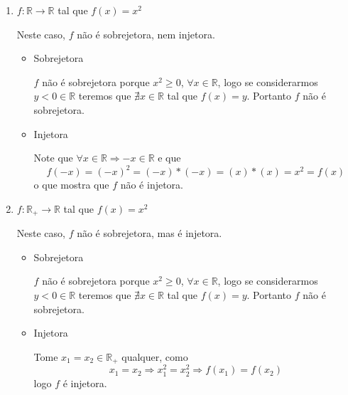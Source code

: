 \begin{exem}

 \begin{enumerate}
  \item $f: \mathbb{R} \rightarrow \mathbb{R}$ tal que $f(x) = x^2$

  Neste caso, $f$ não é sobrejetora, nem injetora.

  \begin{dem}

   \begin{itemize}
    \item Sobrejetora

    $f$ não é sobrejetora porque $x^2 \geq 0$, $\forall x \in \mathbb{R}$, logo se considerarmos $y < 0 \in \mathbb{R}$ teremos que $\nexists x \in \mathbb{R}$ tal que $f(x)= y$. Portanto $f$ não é sobrejetora.
    \fim
    \item Injetora

     Note que $ \forall x \in \mathbb{R} \Rightarrow -x \in \mathbb{R}$ e que
\begin{equation}
f(-x)= (-x)^2 = (-x)*(-x) = (x)*(x) = x^2 = f(x)
\end{equation}
    o que mostra que $f$ não é injetora.

   \end{itemize}
  \end{dem}

  \item $f: \mathbb{R_{+}} \rightarrow \mathbb{R}$ tal que $f(x) = x^2$

  Neste caso, $f$ não é sobrejetora, mas é injetora.

  \begin{dem}
   \begin{itemize}
    \item Sobrejetora

    $f$ não é sobrejetora porque $x^2 \geq 0$, $\forall x \in \mathbb{R}$, logo se considerarmos $y < 0 \in \mathbb{R}$ teremos que $\nexists x \in \mathbb{R}$ tal que $f(x)= y$. Portanto $f$ não é sobrejetora.
    \fim
    \item Injetora

    Tome $x_1=x_2 \in \mathbb{R_{+}}$ qualquer, como
\begin{equation}
x_1=x_2 \Rightarrow x_1^2=x_2^2 \Rightarrow f(x_1)=f(x_2)
\end{equation}
    logo $f$ é injetora.

   \end{itemize}
  \end{dem}


\end{enumerate}
\end{exem}
